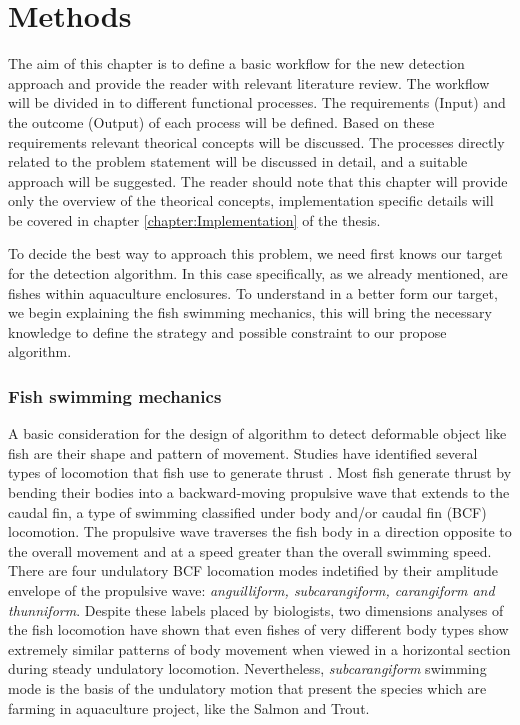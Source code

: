 \chapter{Methods}
\label{chapter:Methods}

The aim of this chapter is to define a basic workflow for the new detection approach
and provide the reader with relevant literature review. The workflow will be divided
in to different functional processes. The requirements (Input) and the outcome (Output)
of each process will be defined. Based on these requirements relevant theorical concepts
will be discussed. The processes directly related to the problem statement will be 
discussed in detail, and a suitable approach will be suggested. The reader should
note that this chapter will provide only the overview of the theorical concepts, 
implementation specific details will be covered in chapter \ref{chapter:Implementation} of the thesis.

To decide the best way to approach this problem, we need first knows our target for
the detection algorithm. In this case specifically, as we already mentioned, are fishes
within aquaculture enclosures. To understand in a better form our target, we begin
explaining the fish swimming mechanics, this will bring the necessary knowledge to define 
the strategy and possible constraint to our propose algorithm.

\subsection{Fish swimming mechanics}
A basic consideration for the design of algorithm to detect deformable object like fish are
their shape and pattern of movement. Studies have identified several types of locomotion that
fish use to generate thrust \citet{Hawkes2008,Colgate2004}. Most fish generate thrust by bending their
bodies into a backward-moving propulsive wave that extends to the caudal fin, a type of
swimming classified under body and/or caudal fin (BCF) locomotion. The propulsive wave traverses
the fish body in a direction opposite to the overall movement and at a speed greater than 
the overall swimming speed. There are four undulatory BCF locomation modes indetified by their
amplitude envelope of the propulsive wave: \textit{anguilliform, subcarangiform, 
carangiform and thunniform}. Despite these labels placed by biologists, two dimensions analyses
of the fish locomotion have shown that even fishes of very different body types show extremely similar 
patterns of body movement when viewed in a horizontal section during steady undulatory locomotion. 
Nevertheless, \textit{subcarangiform} swimming mode is the basis of the undulatory motion that present
the species which are farming in aquaculture project, like the Salmon and Trout.


